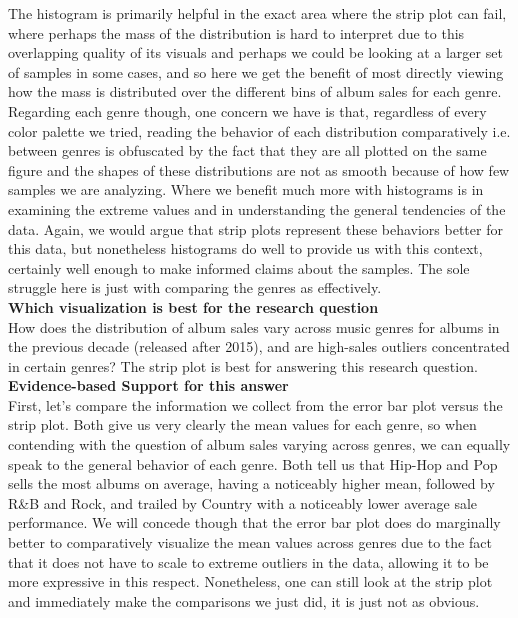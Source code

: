 The histogram is primarily helpful in the exact area where the strip plot can fail, where perhaps the mass of the distribution is hard to interpret due to this overlapping quality of its visuals and perhaps we could be looking at a larger set of samples in some cases, and so here we get the benefit of most directly viewing how the mass is distributed over the different bins of album sales for each genre. Regarding each genre though, one concern we have is that, regardless of every color palette we tried, reading the behavior of each distribution comparatively i.e. between genres is obfuscated by the fact that they are all plotted on the same figure and the shapes of these distributions are not as smooth because of how few samples we are analyzing. Where we benefit much more with histograms is in examining the extreme values and in understanding the general tendencies of the data. Again, we would argue that strip plots represent these behaviors better for this data, but nonetheless histograms do well to provide us with this context, certainly well enough to make informed claims about the samples. The sole struggle here is just with comparing the genres as effectively.\\

\textbf{Which visualization is best for the research question}\\

How does the distribution of album sales vary across music genres for albums in the previous decade (released after 2015), and are high-sales outliers concentrated in certain genres? The strip plot is best for answering this research question.\\

\textbf{Evidence-based Support for this answer}\\

First, let's compare the information we collect from the error bar plot versus the strip plot. Both give us very clearly the mean values for each genre, so when contending with the question of album sales varying across genres, we can equally speak to the general behavior of each genre. Both tell us that Hip-Hop and Pop sells the most albums on average, having a noticeably higher mean, followed by R\&B and Rock, and trailed by Country with a noticeably lower average sale performance. We will concede though that the error bar plot does do marginally better to comparatively visualize the mean values across genres due to the fact that it does not have to scale to extreme outliers in the data, allowing it to be more expressive in this respect. Nonetheless, one can still look at the strip plot and immediately make the comparisons we just did, it is just not as obvious.\\

